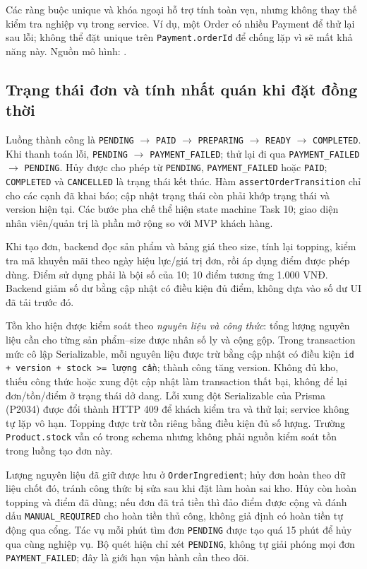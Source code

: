Các ràng buộc unique và khóa ngoại hỗ trợ tính toàn vẹn, nhưng không thay thế kiểm tra nghiệp vụ trong service. Ví dụ, một Order có nhiều Payment để thử lại sau lỗi; không thể đặt unique trên \texttt{Payment.orderId} để chống lặp vì sẽ mất khả năng này. Nguồn mô hình: .

\subsection{Trạng thái đơn và tính nhất quán khi đặt đồng thời}

Luồng thành công là \texttt{PENDING} $\rightarrow$ \texttt{PAID} $\rightarrow$ \texttt{PREPARING} $\rightarrow$ \texttt{READY} $\rightarrow$ \texttt{COMPLETED}. Khi thanh toán lỗi, \texttt{PENDING} $\rightarrow$ \texttt{PAYMENT\_FAILED}; thử lại đi qua \texttt{PAYMENT\_FAILED} $\rightarrow$ \texttt{PENDING}. Hủy được cho phép từ \texttt{PENDING}, \texttt{PAYMENT\_FAILED} hoặc \texttt{PAID}; \texttt{COMPLETED} và \texttt{CANCELLED} là trạng thái kết thúc. Hàm \texttt{assertOrderTransition} chỉ cho các cạnh đã khai báo; cập nhật trạng thái còn phải khớp trạng thái và version hiện tại. Các bước pha chế thể hiện state machine Task 10; giao diện nhân viên/quản trị là phần mở rộng so với MVP khách hàng.

Khi tạo đơn, backend đọc sản phẩm và bảng giá theo size, tính lại topping, kiểm tra mã khuyến mãi theo ngày hiệu lực/giá trị đơn, rồi áp dụng điểm được phép dùng. Điểm sử dụng phải là bội số của 10; 10 điểm tương ứng 1.000 VNĐ. Backend giảm số dư bằng cập nhật có điều kiện đủ điểm, không dựa vào số dư UI đã tải trước đó.

Tồn kho hiện được kiểm soát theo \emph{nguyên liệu và công thức}: tổng lượng nguyên liệu cần cho từng sản phẩm--size được nhân số ly và cộng gộp. Trong transaction mức cô lập Serializable, mỗi nguyên liệu được trừ bằng cập nhật có điều kiện \texttt{id + version + stock >= lượng cần}; thành công tăng version. Không đủ kho, thiếu công thức hoặc xung đột cập nhật làm transaction thất bại, không để lại đơn/tồn/điểm ở trạng thái dở dang. Lỗi xung đột Serializable của Prisma (P2034) được đổi thành HTTP 409 để khách kiểm tra và thử lại; service không tự lặp vô hạn. Topping được trừ tồn riêng bằng điều kiện đủ số lượng. Trường \texttt{Product.stock} vẫn có trong schema nhưng không phải nguồn kiểm soát tồn trong luồng tạo đơn này.

Lượng nguyên liệu đã giữ được lưu ở \texttt{OrderIngredient}; hủy đơn hoàn theo dữ liệu chốt đó, tránh công thức bị sửa sau khi đặt làm hoàn sai kho. Hủy còn hoàn topping và điểm đã dùng; nếu đơn đã trả tiền thì đảo điểm được cộng và đánh dấu \texttt{MANUAL\_REQUIRED} cho hoàn tiền thủ công, không giả định có hoàn tiền tự động qua cổng. Tác vụ mỗi phút tìm đơn \texttt{PENDING} được tạo quá 15 phút để hủy qua cùng nghiệp vụ. Bộ quét hiện chỉ xét \texttt{PENDING}, không tự giải phóng mọi đơn \texttt{PAYMENT\_FAILED}; đây là giới hạn vận hành cần theo dõi.

